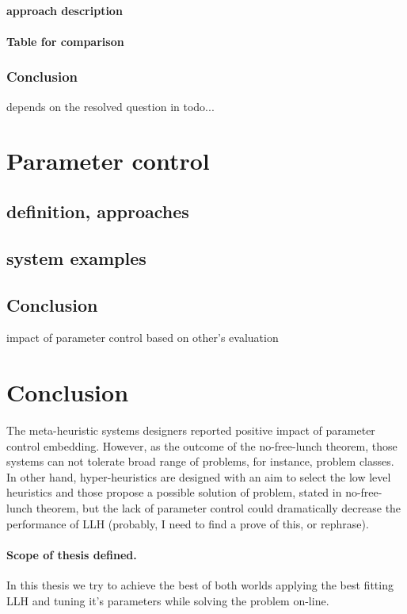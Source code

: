 \paragraph{approach description}



\paragraph{Table for comparison}

\subsubsection{Conclusion}
depends on the resolved question in todo...


\section{Parameter control}\label{bg: parameter control}
\subsection{definition, approaches}
\subsection{system examples}
\subsection{Conclusion} impact of parameter control based on other's evaluation


\section{Conclusion}

The meta-heuristic systems designers reported positive impact of parameter control embedding. 
However, as the outcome of the no-free-lunch theorem, those systems can not tolerate broad range of problems, for instance, problem classes.
In other hand, hyper-heuristics are designed with an aim to select the low level heuristics and those propose a possible solution of problem, stated in no-free-lunch theorem, but the lack of parameter control could dramatically decrease the performance of LLH (probably, I need to find a prove of this, or rephrase).

\paragraph{Scope of thesis defined.} In this thesis we try to achieve the best of both worlds applying the best fitting LLH and tuning it's parameters while solving the problem on-line.
